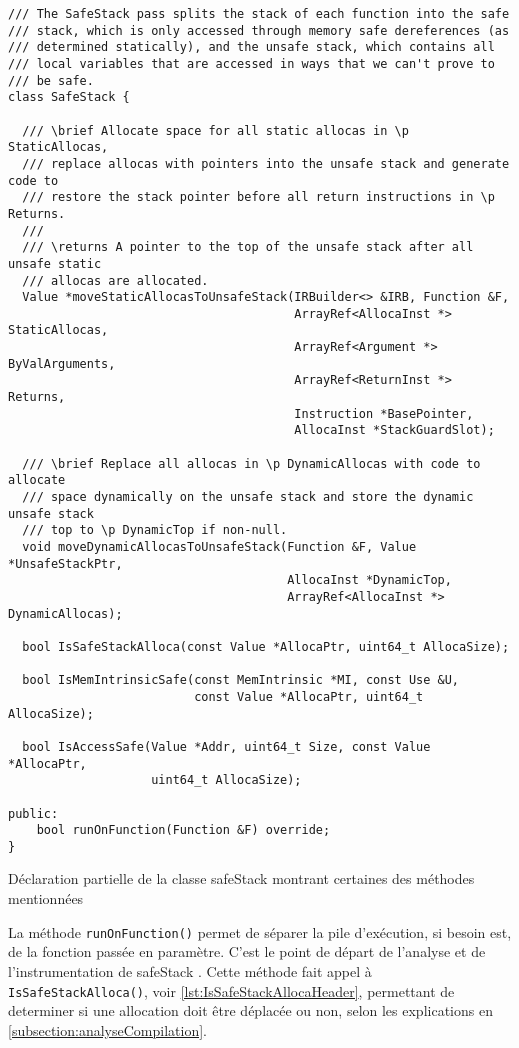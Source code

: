 \begin{listing}
	\begin{verbatim}
/// The SafeStack pass splits the stack of each function into the safe
/// stack, which is only accessed through memory safe dereferences (as
/// determined statically), and the unsafe stack, which contains all
/// local variables that are accessed in ways that we can't prove to
/// be safe.
class SafeStack {

  /// \brief Allocate space for all static allocas in \p StaticAllocas,
  /// replace allocas with pointers into the unsafe stack and generate code to
  /// restore the stack pointer before all return instructions in \p Returns.
  ///
  /// \returns A pointer to the top of the unsafe stack after all unsafe static
  /// allocas are allocated.
  Value *moveStaticAllocasToUnsafeStack(IRBuilder<> &IRB, Function &F,
                                        ArrayRef<AllocaInst *> StaticAllocas,
                                        ArrayRef<Argument *> ByValArguments,
                                        ArrayRef<ReturnInst *> Returns,
                                        Instruction *BasePointer,
                                        AllocaInst *StackGuardSlot);

  /// \brief Replace all allocas in \p DynamicAllocas with code to allocate
  /// space dynamically on the unsafe stack and store the dynamic unsafe stack
  /// top to \p DynamicTop if non-null.
  void moveDynamicAllocasToUnsafeStack(Function &F, Value *UnsafeStackPtr,
                                       AllocaInst *DynamicTop,
                                       ArrayRef<AllocaInst *> DynamicAllocas);

  bool IsSafeStackAlloca(const Value *AllocaPtr, uint64_t AllocaSize);

  bool IsMemIntrinsicSafe(const MemIntrinsic *MI, const Use &U,
                          const Value *AllocaPtr, uint64_t AllocaSize);

  bool IsAccessSafe(Value *Addr, uint64_t Size, const Value *AllocaPtr,
                    uint64_t AllocaSize);

public:
	bool runOnFunction(Function &F) override;
}
	\end{verbatim}
	\caption{Déclaration partielle de la classe \og \gls{safeStack} \fg montrant certaines des méthodes mentionnées}
	\label{lst:SafeStackLegacyPassClass}
\end{listing}

La méthode \texttt{runOnFunction()} permet de séparer la pile d'exécution, si besoin est, de la fonction passée en paramètre. C'est le point de départ de l'analyse et de l'instrumentation de \og \gls{safeStack} \fg. Cette méthode fait appel à \texttt{IsSafeStackAlloca()}, voir \autoref{lst:IsSafeStackAllocaHeader}, permettant de determiner si une allocation doit être déplacée ou non, selon les explications en \autoref{subsection:analyseCompilation}.

